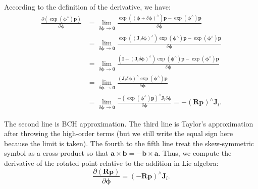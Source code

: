 According to the definition of the derivative, we have:
\begin{align*}
\frac{{\partial \left( {\exp \left( {{ \boldsymbol{\phi} ^ \wedge }} \right) \mathbf{p}} \right)}}{{\partial \boldsymbol{\phi} }} &= \mathop {\lim }\limits_{\delta \boldsymbol{\phi}  \to \mathbf{0}} \frac{{\exp \left( {{{\left( {\boldsymbol{\phi}  + \delta \boldsymbol{\phi} } \right)}^ \wedge }} \right) \mathbf{p} - \exp \left( {{\boldsymbol{\phi} ^ \wedge }} \right)\mathbf{p}}}{{\delta \boldsymbol{\phi} }}\\
& = \mathop {\lim }\limits_{\delta \boldsymbol{\phi}  \to \mathbf{0}} \frac{{\exp \left( {{{\left( {{\mathbf{J}_l}\delta \boldsymbol{\phi} } \right)}^ \wedge }} \right)\exp \left( {{\boldsymbol{\phi} ^ \wedge }} \right) \mathbf{p} - \exp \left( {{\boldsymbol{\phi} ^ \wedge }} \right) \mathbf{p}}}{{\delta \boldsymbol{\phi} }}\\
&= \mathop {\lim }\limits_{\delta \boldsymbol{\phi}  \to \mathbf{0}} \frac{{\left( { \mathbf{I} + {{\left( {{ \mathbf{J}_l}\delta \boldsymbol{\phi} } \right)}^ \wedge }} \right)\exp \left( {{\boldsymbol{\phi} ^ \wedge }} \right) \mathbf{p} - \exp \left( {{\boldsymbol{\phi} ^ \wedge }} \right)\mathbf{p}}}{{\delta \boldsymbol{\phi} }}\\
&= \mathop {\lim }\limits_{\delta \boldsymbol{\phi}  \to \mathbf{0}} \frac{{{{\left( {{\mathbf{J}_l}\delta \boldsymbol{\phi} } \right)}^ \wedge }\exp \left( {{\boldsymbol{\phi} ^ \wedge }} \right)\mathbf{p}}}{{\delta \boldsymbol{\phi} }}\\
&= \mathop {\lim }\limits_{\delta \boldsymbol{\phi}  \to \mathbf{0}} \frac{{ - {{\left( {\exp \left( {{\boldsymbol{\phi} ^ \wedge }} \right)\mathbf{p}} \right)}^ \wedge }{\mathbf{J}_l}\delta \boldsymbol{\phi} }}{{\delta \boldsymbol{\phi}}} =  - {\left( {\mathbf{Rp}} \right)^ \wedge }{\mathbf{J}_l}.
\end{align*}

The second line is BCH approximation. The third line is Taylor's approximation after throwing the high-order terms (but we still write the equal sign here because the limit is taken). The fourth to the fifth line treat the skew-symmetric symbol as a cross-product so that $\mathbf{a} \times \mathbf{b} = -\mathbf{b} \times \mathbf{a}$. Thus, we compute the derivative of the rotated point relative to the addition in Lie algebra:
\begin{equation}
\frac{{\partial \left( { \mathbf{Rp}} \right)}}{{\partial \boldsymbol{\phi} }} = {\left( { - \mathbf{Rp}} \right)^ \wedge }{\mathbf{J}_l}.
\end{equation}

